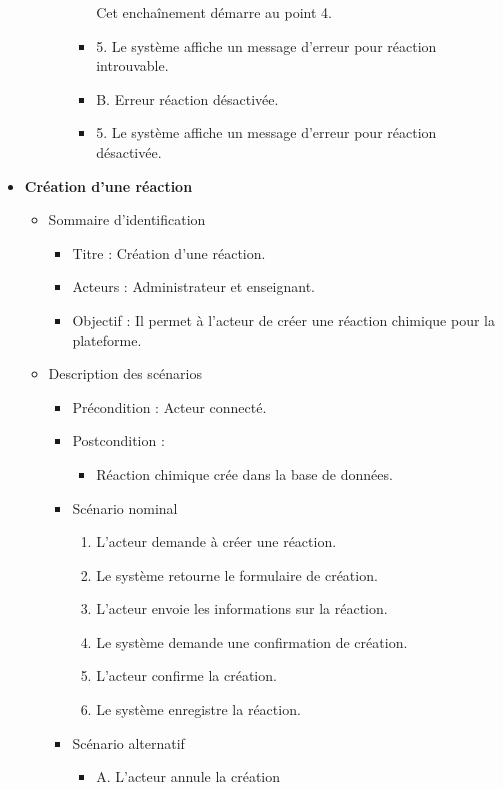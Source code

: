 \begin{itemize}
\begin{itemize}
\begin{itemize}
\begin{itemize}
				                        Cet enchaînement démarre au point 4.

				                  \item 5.  Le système affiche un message d’erreur pour réaction introuvable.
				                  \item B. Erreur réaction désactivée.
				                  \item 5. Le système affiche un message d’erreur pour réaction désactivée.
			                  \end{itemize}
		            \end{itemize}
	      \end{itemize}

	\item \textbf{Création d’une réaction}
	      \begin{itemize}
		      \item Sommaire d’identification
		            \begin{itemize}
			            \item Titre : Création d’une réaction.
			            \item Acteurs : Administrateur et enseignant.
			            \item Objectif : Il permet à l’acteur de créer une réaction chimique pour la plateforme.
		            \end{itemize}
		      \item Description des scénarios
		            \begin{itemize}
			            \item Précondition : Acteur connecté.
			            \item Postcondition :
			                  \begin{itemize}
				                  \item Réaction chimique crée dans la base de données.
			                  \end{itemize}
			            \item Scénario nominal
			                  \begin{enumerate}
				                  \item L’acteur demande à créer une réaction.
				                  \item Le système retourne le formulaire de création.
				                  \item L’acteur envoie les informations sur la réaction.
				                  \item Le système demande une confirmation de création.
				                  \item L’acteur confirme la création.
				                  \item Le système enregistre la réaction.
			                  \end{enumerate}
			            \item Scénario alternatif
			                  \begin{itemize}
				                  \item A. L’acteur annule la création


\end{itemize}
\end{itemize}
\end{itemize}
\end{itemize}
